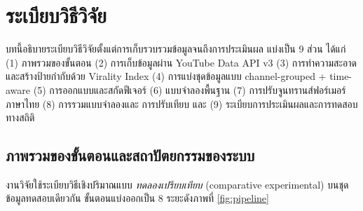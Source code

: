 \chapter{ระเบียบวิธีวิจัย}
\label{ch:method}

บทนี้อธิบายระเบียบวิธีวิจัยตั้งแต่การเก็บรวบรวมข้อมูลจนถึงการประเมินผล
แบ่งเป็น 9 ส่วน ได้แก่ (1) ภาพรวมของขั้นตอน (2) การเก็บข้อมูลผ่าน YouTube
Data API v3 (3) การทำความสะอาดและสร้างป้ายกำกับด้วย Virality Index (4)
การแบ่งชุดข้อมูลแบบ channel-grouped + time-aware (5) การออกแบบและสกัดฟีเจอร์
(6) แบบจำลองพื้นฐาน (7) การปรับจูนทรานส์ฟอร์เมอร์ภาษาไทย (8) การรวมแบบจำลองและ
การปรับเทียบ และ (9) ระเบียบการประเมินผลและการทดสอบทางสถิติ

\section{ภาพรวมของขั้นตอนและสถาปัตยกรรมของระบบ}
\label{sec:method-overview}

งานวิจัยใช้ระเบียบวิธีเชิงปริมาณแบบ \emph{ทดลองเปรียบเทียบ} (comparative
experimental) บนชุดข้อมูลทดสอบเดียวกัน ขั้นตอนแบ่งออกเป็น 8 ระยะดังภาพที่
\ref{fig:pipeline}


